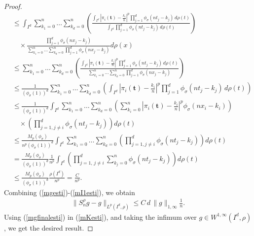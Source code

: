 \documentclass[10pt,a4paper]{amsart}
\newcommand{\LP}{L^p(I^d, \rho)}
\begin{document}
\begin{proof}
\begin{align}
&\leq \int_{I^d}\sum_{k_1=0}^n \ldots \sum_{k_d=0}^n \left( \frac{\int_{I^d} \left|\pi_i(\mathbf{t}) - \frac{k_i}{n}\right|^p \prod_{j=1}^d \phi_\sigma(nt_j - k_j) \, d\rho(t)}{\int_{I^d} \prod_{j=1}^d \phi_\sigma(nt_j - k_j) \, d\rho(t)} \right) \nonumber \\
&\quad \times \frac{\prod_{j=1}^d \phi_\sigma(nx_j - k_j)}{\sum_{k_1=0}^n \ldots \sum_{k_d=0}^n \prod_{j=1}^d \phi_\sigma(nx_j - k_j)}   d\rho(x) \nonumber \\
&\leq \sum_{k_1=0}^n \ldots \sum_{k_d=0}^n  \left( \frac{\int_{I^d} \left|\pi_i(\mathbf{t}) - \frac{k_i}{n}\right|^p \prod_{j=1}^d \phi_\sigma(nt_j - k_j) \, d\rho(t)}{\sum_{k_1=0}^n \ldots \sum_{k_d=0}^n \prod_{j=1}^d \phi_\sigma(nx_j - k_j)} \right) \nonumber\\
&\leq \frac{1}{(\phi_\sigma(1))^d} \sum_{k_1=0}^n \ldots \sum_{k_d=0}^n  \left( \int_{I^d} \left|\pi_i(\mathbf{t}) - \frac{k_i}{n}\right|^p \prod_{j=1}^d \phi_\sigma(nt_j - k_j)\, d\rho(t)\right) \nonumber\\
&\leq \frac{1}{(\phi_\sigma(1))^d} \int_{I^d} \sum_{k_1=0}^n \ldots \sum_{k_d=0}^n  \left( \sum_{k_i=0}^n  \left|\pi_i(\mathbf{t}) - \frac{k_i}{n}\right|^p \phi_\sigma(nx_i-k_i)\right)\nonumber\\
&\quad \times \left( \prod_{j=1, j\neq i }^d \phi_\sigma(nt_j - k_j) \right) d\rho(t) \nonumber \\
&\leq \frac{M_p(\phi_\sigma)}{n^p (\phi_\sigma(1))^d} \int_{I^d} \sum_{k_1=0}^n \ldots \sum_{k_d=0}^n \left( \prod_{j=1, j\neq i }^d \phi_\sigma(nt_j - k_j) \right)d\rho(t) \nonumber \\
&=\frac{M_p(\phi_\sigma)}{(\phi_\sigma(1))^d} \frac{1}{n^p}\int_{I^d} \left( \prod_{j=1,\, j\neq i}^d \sum_{k_j=0}^n \phi_\sigma(nt_j-k_j)\right) d\rho(t) \nonumber \\
&\leq \frac{M_p(\phi_\sigma)}{(\phi_\sigma(1))^d} \frac{\rho(I^d)}{n^p} = \frac{C}{n^p}. \label{mI1esti}
\end{align}
Combining (\ref{mgesti})-(\ref{mI1esti}), we obtain \begin{align}
     \|S^{\rho}_ng-g\|_{\LP}  \leq C\,d\,\|g\|_{1,\infty} \frac{1}{n}. \label{mgfinalesti}
\end{align}
Using (\ref{mgfinalesti}) in (\ref{mKesti}), and taking the infimum over $g\in W^{1,\infty}(I^d,\rho)$, we get the desired result.
\end{proof}
\end{document}
